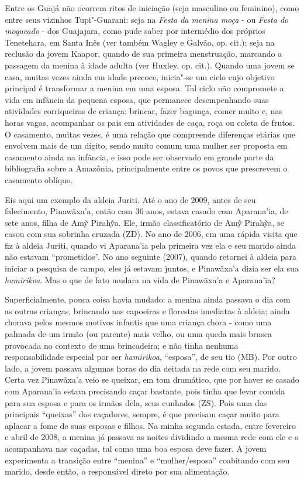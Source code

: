 Entre os Guajá não ocorrem ritos de iniciação (seja masculino ou
feminino), como entre seus vizinhos Tupi"-Guarani: seja na \emph{Festa da
menina moça} - ou \emph{Festa do moqueado} - dos Guajajara, como pude
saber por intermédio dos próprios Tenetehara, em Santa Inês (ver também
Wagley e Galvão, op. cit.); seja na reclusão da jovem Kaapor, quando de
sua primeira menstruação, marcando a passagem da menina à idade adulta
(ver Huxley, op. cit.). Quando uma jovem se casa, muitas vezes ainda em
idade precoce, inicia"-se um ciclo cujo objetivo principal é transformar
a menina em uma esposa. Tal ciclo não compromete a vida em infância da
pequena esposa, que permanece desempenhando suas atividades corriqueiras
de criança: brincar, fazer bagunça, comer muito e, nas horas vagas,
acompanhar os pais em atividades de caça, roça ou coleta de frutos. O
casamento, muitas vezes, é uma relação que compreende diferenças etárias
que envolvem mais de um dígito, sendo muito comum uma mulher ser
proposta em casamento ainda na infância, e isso pode ser observado em
grande parte da bibliografia sobre a Amazônia, principalmente entre os
povos que prescrevem o casamento oblíquo.

Eis aqui um exemplo da aldeia Juriti. Até o ano de 2009, antes de seu
falecimento, Pinawãxa'a, então com 36 anos, estava casado com
Aparana'ia, de sete anos, filha de Amỹ Pirahỹa. Ele, irmão
classificatório de Amỹ Pirahỹa, se casou com sua sobrinha cruzada (ZD).
No ano de 2006, em uma rápida visita que fiz à aldeia Juriti, quando vi
Aparana'ia pela primeira vez ela e seu marido ainda não estavam
``prometidos''. No ano seguinte (2007), quando retornei à aldeia para
iniciar a pesquisa de campo, eles já estavam juntos, e Pinawãxa'a dizia
ser ela sua \emph{hamirikoa}. Mas o que de fato mudara na vida de
Pinawãxa'a e Aparana'ia?

Superficialmente, pouca coisa havia mudado: a menina ainda passava o dia
com as outras crianças, brincando nas capoeiras e florestas imediatas à
aldeia; ainda chorava pelos mesmos motivos infantis que uma criança
chora - como uma palmada de um irmão (ou parente) mais velho, ou uma
queda mais brusca provocada no contexto de uma brincadeira; e não tinha
nenhuma responsabilidade especial por ser \emph{hamirikoa}, ``esposa'', de
seu tio (MB). Por outro lado, a jovem passava algumas horas do dia
deitada na rede com seu marido. Certa vez Pinawãxa'a veio se queixar, em
tom dramático, que por haver se casado com Aparana'ia estava precisando
caçar bastante, pois tinha que levar comida para sua esposa e para os
irmãos dela, seus cunhados (ZS). Pois uma das principais ``queixas'' dos
caçadores, sempre, é que precisam caçar muito para aplacar a fome de
suas esposas e filhos. Na minha segunda estada, entre fevereiro e abril
de 2008, a menina já passava as noites dividindo a mesma rede com ele e
o acompanhava nas caçadas, tal como uma boa esposa deve fazer. A jovem
experimenta a transição entre ``menina'' e ``mulher/esposa'' coabitando
com seu marido, desde então, o responsável direto por sua alimentação.

